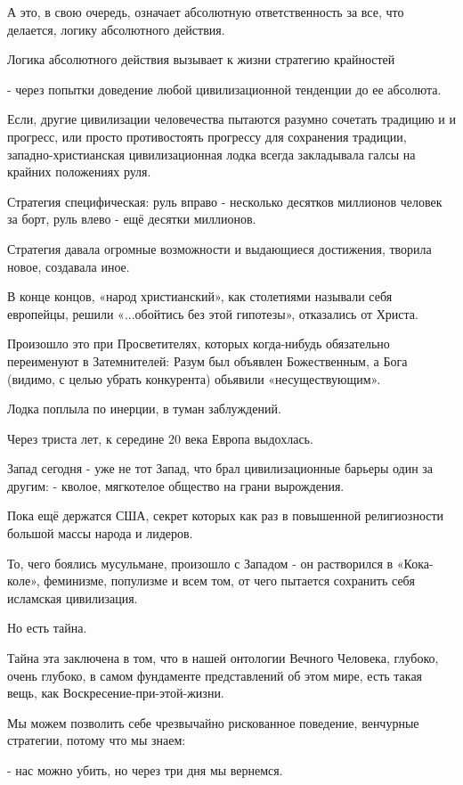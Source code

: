 А это, в свою очередь, означает абсолютную ответственность за все, что
делается, логику абсолютного действия.  

Логика абсолютного действия вызывает к жизни стратегию крайностей

- через попытки доведение любой цивилизационной тенденции до ее абсолюта. 

Если, другие цивилизации человечества пытаются разумно сочетать традицию и и
прогресс, или просто противостоять прогрессу для сохранения традиции,
западно-христианская цивилизационная лодка всегда закладывала галсы на крайних
положениях руля.

Стратегия специфическая: руль вправо - несколько десятков миллионов человек за
борт, руль влево - ещё десятки миллионов. 

Стратегия давала огромные возможности и выдающиеся достижения, творила новое,
создавала иное. 

В конце концов, «народ христианский», как столетиями называли себя европейцы,
решили «...обойтись без этой гипотезы», отказались от Христа.

Произошло это при Просветителях, которых когда-нибудь обязательно переименуют в
Затемнителей: Разум был объявлен Божественным, а Бога (видимо, с целью убрать
конкурента) обьявили «несуществующим».

Лодка поплыла по инерции, в туман заблуждений.

Через триста лет, к середине 20 века Европа выдохлась. 

Запад сегодня - уже не тот Запад, что брал цивилизационные барьеры один за
другим: - кволое, мягкотелое общество на грани вырождения. 

Пока ещё держатся США, секрет которых как раз в повышенной религиозности большой массы народа и лидеров. 

То, чего боялись мусульмане, произошло с Западом - он растворился в
«Кока-коле», феминизме, популизме и всем том, от чего пытается сохранить себя
исламская цивилизация.

Но есть тайна. 

Тайна эта заключена в том, что в нашей онтологии Вечного Человека, глубоко,
очень глубоко, в самом фундаменте представлений об этом мире, есть такая вещь,
как Воскресение-при-этой-жизни.

Мы можем позволить себе чрезвычайно рискованное поведение, венчурные стратегии,
потому что мы знаем: 

- нас можно убить, но через три дня мы вернемся.


